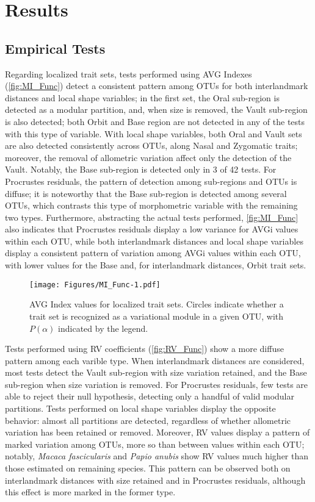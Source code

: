 \documentclass[12pt,]{article}
\begin{document}
\section{Results}\label{results}

\subsection{Empirical Tests}\label{empirical-tests}

Regarding localized trait sets, tests performed using AVG Indexes
(\autoref{fig:MI_Func}) detect a consistent pattern among OTUs for both
interlandmark distances and local shape variables; in the first set, the
Oral sub-region is detected as a modular partition, and, when size is
removed, the Vault sub-region is also detected; both Orbit and Base
region are not detected in any of the tests with this type of variable.
With local shape variables, both Oral and Vault sets are also detected
consistently across OTUs, along Nasal and Zygomatic traits; moreover,
the removal of allometric variation affect only the detection of the
Vault. Notably, the Base sub-region is detected only in 3 of 42 tests.
For Procrustes residuals, the pattern of detection among sub-regions and
OTUs is diffuse; it is noteworthy that the Base sub-region is detected
among several OTUs, which contrasts this type of morphometric variable
with the remaining two types. Furthermore, abstracting the actual tests
performed, \autoref{fig:MI_Func} also indicates that Procrustes
residuals display a low variance for AVGi values within each OTU, while
both interlandmark distances and local shape variables display a
consistent pattern of variation among AVGi values within each OTU, with
lower values for the Base and, for interlandmark distances, Orbit trait
sets.

\begin{figure}[htbp]
\centering
\texttt{[image: Figures/MI\_Func-1.pdf]}
\caption{AVG Index values for localized trait sets. Circles indicate
whether a trait set is recognized as a variational module in a given
OTU, with $P(\alpha)$ indicated by the legend. \label{fig:MI_Func}}
\end{figure}

Tests performed using RV coefficients (\autoref{fig:RV_Func}) show a
more diffuse pattern among each varible type. When interlandmark
distances are considered, most tests detect the Vault sub-region with
size variation retained, and the Base sub-region when size variation is
removed. For Procrustes residuals, few tests are able to reject their
null hypothesis, detecting only a handful of valid modular partitions.
Tests performed on local shape variables display the opposite behavior:
almost all partitions are detected, regardless of whether allometric
variation has been retained or removed. Moreover, RV values display a
pattern of marked variation among OTUs, more so than between values
within each OTU; notably, \emph{Macaca fascicularis} and \emph{Papio
anubis} show RV values much higher than those estimated on remaining
species. This pattern can be observed both on interlandmark distances
with size retained and in Procrustes residuals, although this effect is
more marked in the former type.
\end{document}
